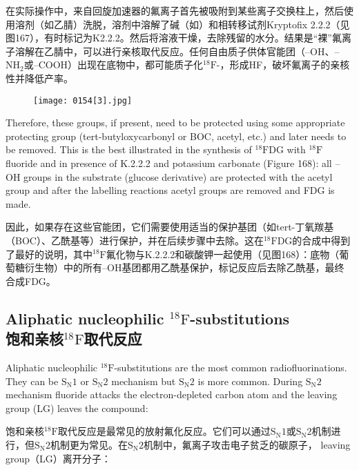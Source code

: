 \documentclass[dvipsnames, svgnames,a4paper,11pt]{article}
\begin{document}
在实际操作中，来自回旋加速器的氟离子首先被吸附到某些离子交换柱上，然后使用溶剂（如乙腈）洗脱，溶剂中溶解了碱（如）和相转移试剂Kryptofix 2.2.2（见图167），有时标记为K2.2.2。然后将溶液干燥，去除残留的水分。结果是“裸”氟离子溶解在乙腈中，可以进行亲核取代反应。任何自由质子供体官能团（–OH、–NH${}_2$或–COOH）出现在底物中，都可能质子化${}^\mathrm{18}\mathrm{F}$-，形成HF，破坏氟离子的亲核性并降低产率。

\begin{figure}[h]
	\centering
    \texttt{[image: 0154[3].jpg]}    
     \label{fig168}
\end{figure}

Therefore, these groups, if present, need to be protected using some appropriate
protecting group (tert-butyloxycarbonyl or BOC, acetyl, etc.) and later needs to be
removed. This is the best illustrated in the synthesis of ${}^\mathrm{18}\mathrm{F}$DG with ${}^\mathrm{18}\mathrm{F}$ fluoride and in
presence of K.2.2.2 and potassium carbonate (Figure 168): all –OH groups in the
substrate (glucose derivative) are protected with the acetyl group and after the
labelling reactions acetyl groups are removed and FDG is made.

因此，如果存在这些官能团，它们需要使用适当的保护基团（如tert-丁氧羰基（BOC）、乙酰基等）进行保护，并在后续步骤中去除。这在${}^\mathrm{18}\mathrm{F}$DG的合成中得到了最好的说明，其中${}^\mathrm{18}\mathrm{F}$氟化物与K.2.2.2和碳酸钾一起使用（见图168）：底物（葡萄糖衍生物）中的所有–OH基团都用乙酰基保护，标记反应后去除乙酰基，最终合成FDG。

\subsection{Aliphatic nucleophilic ${}^\mathrm{18}\mathrm{F}$-substitutions \\饱和亲核${}^\mathrm{18}\mathrm{F}$取代反应}

Aliphatic nucleophilic ${}^\mathrm{18}\mathrm{F}$-substitutions are the most common radiofluorinations. They
can be $\mathrm{S_N1}$ or $\mathrm{S_N2}$ mechanism but $\mathrm{S_N2}$ is more common. During $\mathrm{S_N2}$ mechanism
fluoride attacks the electron-depleted carbon atom and the leaving group (LG) leaves
the compound:

饱和亲核${}^\mathrm{18}\mathrm{F}$取代反应是最常见的放射氟化反应。它们可以通过$\mathrm{S_N1}$或$\mathrm{S_N2}$机制进行，但$\mathrm{S_N2}$机制更为常见。在$\mathrm{S_N2}$机制中，氟离子攻击电子贫乏的碳原子， leaving group（LG）离开分子：
\end{document}
